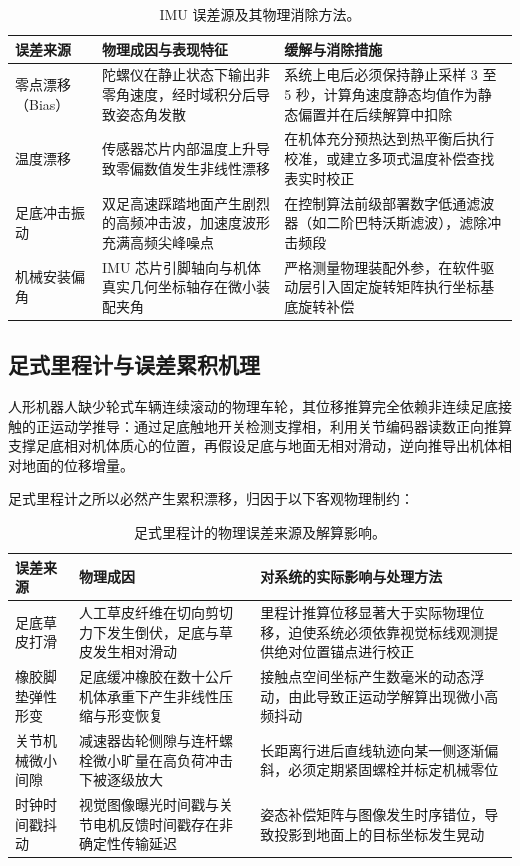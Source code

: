 \begin{table}[H]
\centering
\small
\begin{tabularx}{\textwidth}{p{2.8cm} p{5.4cm} X}
\toprule
\textbf{误差来源} & \textbf{物理成因与表现特征} & \textbf{缓解与消除措施} \\
\midrule
零点漂移（Bias） & 陀螺仪在静止状态下输出非零角速度，经时域积分后导致姿态角发散 & 系统上电后必须保持静止采样 3 至 5 秒，计算角速度静态均值作为静态偏置并在后续解算中扣除 \\
\addlinespace
温度漂移 & 传感器芯片内部温度上升导致零偏数值发生非线性漂移 & 在机体充分预热达到热平衡后执行校准，或建立多项式温度补偿查找表实时校正 \\
\addlinespace
足底冲击振动 & 双足高速踩踏地面产生剧烈的高频冲击波，加速度波形充满高频尖峰噪点 & 在控制算法前级部署数字低通滤波器（如二阶巴特沃斯滤波），滤除冲击频段 \\
\addlinespace
机械安装偏角 & IMU 芯片引脚轴向与机体真实几何坐标轴存在微小装配夹角 & 严格测量物理装配外参，在软件驱动层引入固定旋转矩阵执行坐标基底旋转补偿 \\
\bottomrule
\end{tabularx}
\caption{IMU 误差源及其物理消除方法。}
\end{table}

\subsection{足式里程计与误差累积机理}

人形机器人缺少轮式车辆连续滚动的物理车轮，其位移推算完全依赖非连续足底接触的正运动学推导：通过足底触地开关检测支撑相，利用关节编码器读数正向推算支撑足底相对机体质心的位置，再假设足底与地面无相对滑动，逆向推导出机体相对地面的位移增量。

足式里程计之所以必然产生累积漂移，归因于以下客观物理制约：

\begin{table}[H]
\centering
\small
\begin{tabularx}{\textwidth}{p{2.8cm} p{5.2cm} X}
\toprule
\textbf{误差来源} & \textbf{物理成因} & \textbf{对系统的实际影响与处理方法} \\
\midrule
足底草皮打滑 & 人工草皮纤维在切向剪切力下发生倒伏，足底与草皮发生相对滑动 & 里程计推算位移显著大于实际物理位移，迫使系统必须依靠视觉标线观测提供绝对位置锚点进行校正 \\
\addlinespace
橡胶脚垫弹性形变 & 足底缓冲橡胶在数十公斤机体承重下产生非线性压缩与形变恢复 & 接触点空间坐标产生数毫米的动态浮动，由此导致正运动学解算出现微小高频抖动 \\
\addlinespace
关节机械微小间隙 & 减速器齿轮侧隙与连杆螺栓微小旷量在高负荷冲击下被逐级放大 & 长距离行进后直线轨迹向某一侧逐渐偏斜，必须定期紧固螺栓并标定机械零位 \\
\addlinespace
时钟时间戳抖动 & 视觉图像曝光时间戳与关节电机反馈时间戳存在非确定性传输延迟 & 姿态补偿矩阵与图像发生时序错位，导致投影到地面上的目标坐标发生晃动 \\
\bottomrule
\end{tabularx}
\caption{足式里程计的物理误差来源及解算影响。}
\end{table}

